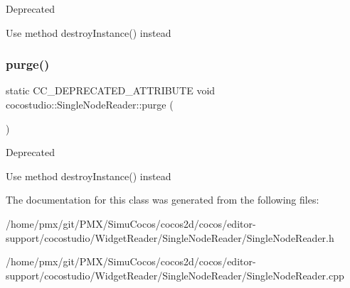 \begin{DoxyRefDesc}{Deprecated}
\item[\hyperlink{deprecated__deprecated000101}{Deprecated}]Use method destroy\+Instance() instead \end{DoxyRefDesc}
\mbox{\label{classcocostudio_1_1SingleNodeReader_ab5e2f5f0a9e8c2e633ebad6e81a0e62d}} 
\subsubsection{\texorpdfstring{purge()}{purge()}\hspace{0.1cm}{\footnotesize\ttfamily [2/2]}}
{\footnotesize\ttfamily static C\+C\+\_\+\+D\+E\+P\+R\+E\+C\+A\+T\+E\+D\+\_\+\+A\+T\+T\+R\+I\+B\+U\+TE void cocostudio\+::\+Single\+Node\+Reader\+::purge (\begin{DoxyParamCaption}{ }\end{DoxyParamCaption})\hspace{0.3cm}{\ttfamily [static]}}

\begin{DoxyRefDesc}{Deprecated}
\item[\hyperlink{deprecated__deprecated000336}{Deprecated}]Use method destroy\+Instance() instead \end{DoxyRefDesc}


The documentation for this class was generated from the following files\+:\begin{DoxyCompactItemize}
\item 
/home/pmx/git/\+P\+M\+X/\+Simu\+Cocos/cocos2d/cocos/editor-\/support/cocostudio/\+Widget\+Reader/\+Single\+Node\+Reader/Single\+Node\+Reader.\+h\item 
/home/pmx/git/\+P\+M\+X/\+Simu\+Cocos/cocos2d/cocos/editor-\/support/cocostudio/\+Widget\+Reader/\+Single\+Node\+Reader/Single\+Node\+Reader.\+cpp\end{DoxyCompactItemize}
